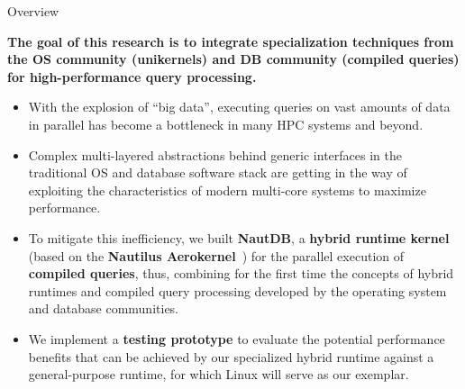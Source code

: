 



\begin{block}{Overview}
\begin{overviewbox}
    \textbf{The goal of this research is to integrate specialization techniques from the OS community
      (unikernels) and  DB community (compiled queries) for high-performance query processing.}
\end{overviewbox}
  \begin{itemize}
  \item   With the explosion of ``big data'', executing queries on vast amounts of data in parallel has become a bottleneck in many HPC systems and beyond.
  \item   Complex multi-layered abstractions behind generic interfaces in the traditional OS and database software stack are getting in the way of exploiting the characteristics of modern multi-core systems to maximize performance.
  \item   To mitigate this inefficiency, we built \textbf{NautDB}, a \textbf{hybrid runtime kernel} (based on the \textbf{Nautilus Aerokernel}~\cite{HALE:2015:NAUTILUS}) for the parallel execution of \textbf{compiled queries}, thus, combining for the first time the concepts of hybrid runtimes and compiled query processing developed by the operating system and database communities.
  \item   We implement a \textbf{testing prototype} to evaluate the potential performance benefits that can be achieved by our specialized hybrid runtime against a general-purpose runtime, for which Linux will serve as our exemplar.
  \end{itemize}
\end{block}

